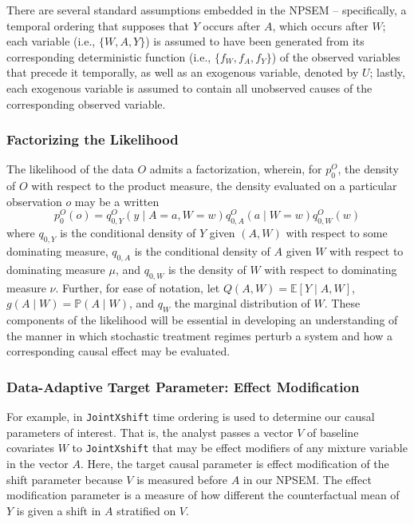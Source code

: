 \documentclass[
]{article}
\begin{document}
There are several standard assumptions embedded in the NPSEM --
specifically, a temporal ordering that supposes that \(Y\) occurs after
\(A\), which occurs after \(W\); each variable (i.e., \(\{W, A, Y\}\))
is assumed to have been generated from its corresponding deterministic
function (i.e., \(\{f_W, f_A, f_Y\}\)) of the observed variables that
precede it temporally, as well as an exogenous variable, denoted by
\(U\); lastly, each exogenous variable is assumed to contain all
unobserved causes of the corresponding observed variable.

\hypertarget{factorizing-the-likelihood}{%
\subsubsection{Factorizing the
Likelihood}\label{factorizing-the-likelihood}}

The likelihood of the data \(O\) admits a factorization, wherein, for
\(p_0^O\), the density of \(O\) with respect to the product measure, the
density evaluated on a particular observation \(o\) may be a written
\begin{equation}
  p_0^O(o) = q^O_{0,Y}(y \mid A = a, W = w) q^O_{0,A}(a \mid W = w)
  q^O_{0,W}(w)
\end{equation} where \(q_{0, Y}\) is the conditional density of \(Y\)
given \((A, W)\) with respect to some dominating measure, \(q_{0, A}\)
is the conditional density of \(A\) given \(W\) with respect to
dominating measure \(\mu\), and \(q_{0, W}\) is the density of \(W\)
with respect to dominating measure \(\nu\). Further, for ease of
notation, let \(Q(A, W) = \mathbb{E}[Y \mid A, W]\),
\(g(A \mid W) = \mathbb{P}(A \mid W)\), and \(q_W\) the marginal
distribution of \(W\). These components of the likelihood will be
essential in developing an understanding of the manner in which
stochastic treatment regimes perturb a system and how a corresponding
causal effect may be evaluated.

\hypertarget{data-adaptive-target-parameter-effect-modification}{%
\subsubsection{Data-Adaptive Target Parameter: Effect
Modification}\label{data-adaptive-target-parameter-effect-modification}}

For example, in \texttt{JointXshift} time ordering is used to determine
our causal parameters of interest. That is, the analyst passes a vector
\(V\) of baseline covariates \(W\) to \texttt{JointXshift} that may be
effect modifiers of any mixture variable in the vector \(A\). Here, the
target causal parameter is effect modification of the shift parameter
because \(V\) is measured before \(A\) in our NPSEM. The effect
modification parameter is a measure of how different the counterfactual
mean of \(Y\) is given a shift in \(A\) stratified on \(V\).
\end{document}
